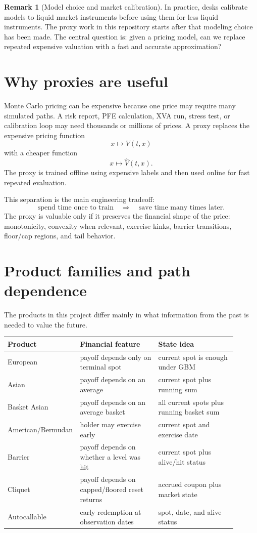 \documentclass[11pt,oneside]{book}
\theoremstyle{definition}
\newtheorem{remark}{Remark}[chapter]
\begin{document}
\begin{remark}[Model choice and market calibration]
In practice, desks calibrate models to liquid market instruments before using them for less liquid instruments. The proxy work in this repository starts after that modeling choice has been made. The central question is: given a pricing model, can we replace repeated expensive valuation with a fast and accurate approximation?
\end{remark}

\section{Why proxies are useful}
Monte Carlo pricing can be expensive because one price may require many simulated paths. A risk report, PFE calculation, XVA run, stress test, or calibration loop may need thousands or millions of prices. A proxy replaces the expensive pricing function
\[
  x \longmapsto V(t,x)
\]
with a cheaper function
\[
  x \longmapsto \widehat V(t,x).
\]
The proxy is trained offline using expensive labels and then used online for fast repeated evaluation.

This separation is the main engineering tradeoff:
\[
  \text{spend time once to train} \quad \Longrightarrow \quad \text{save time many times later}.
\]
The proxy is valuable only if it preserves the financial shape of the price: monotonicity, convexity when relevant, exercise kinks, barrier transitions, floor/cap regions, and tail behavior.

\section{Product families and path dependence}
The products in this project differ mainly in what information from the past is needed to value the future.

\begin{longtable}{@{}p{0.22\linewidth}p{0.34\linewidth}p{0.34\linewidth}@{}}
\toprule
Product & Financial feature & State idea\\
\midrule
European & payoff depends only on terminal spot & current spot is enough under GBM\\
Asian & payoff depends on an average & current spot plus running sum\\
Basket Asian & payoff depends on an average basket & all current spots plus running basket sum\\
American/Bermudan & holder may exercise early & current spot and exercise date\\
Barrier & payoff depends on whether a level was hit & current spot plus alive/hit status\\
Cliquet & payoff depends on capped/floored reset returns & accrued coupon plus market state\\
Autocallable & early redemption at observation dates & spot, date, and alive status\\
\bottomrule
\end{longtable}
\end{document}
